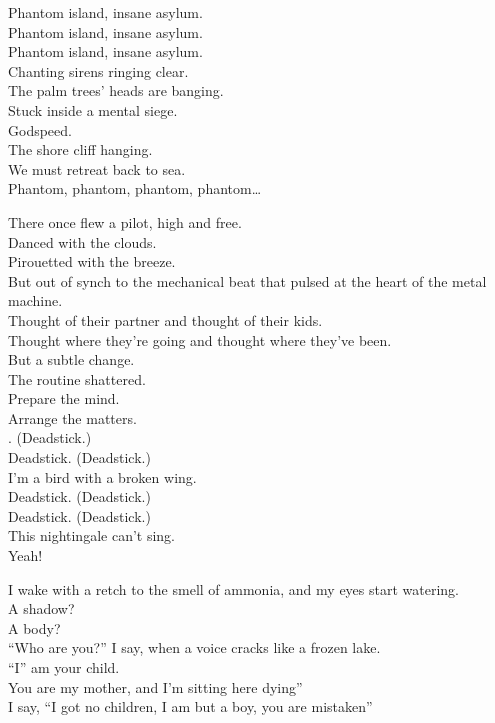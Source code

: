 Phantom island, insane asylum. \\
Phantom island, insane asylum. \\
Phantom island, insane asylum. \\
Chanting sirens ringing clear. \\

The palm trees' heads are banging. \\
Stuck inside a mental siege. \\
Godspeed. \\
The shore cliff hanging. \\
We must retreat back to sea. \\

Phantom, phantom, phantom, phantom… \\




There once flew a pilot, high and free. \\
Danced with the clouds. \\
Pirouetted with the breeze. \\
But out of synch to the mechanical beat that pulsed at the heart of the metal machine. \\
Thought of their partner and thought of their kids. \\
Thought where they're going and thought where they've been. \\
But a subtle change. \\
The routine shattered. \\
Prepare the mind. \\
Arrange the matters. \\

. (Deadstick.) \\
Deadstick. (Deadstick.) \\
I'm a bird with a broken wing. \\
Deadstick. (Deadstick.) \\
Deadstick. (Deadstick.) \\
This nightingale can't sing. \\
Yeah! \\


I wake with a retch to the smell of ammonia, and my eyes start watering. \\
A shadow? \\
A body? \\
``Who are you?'' I say, when a voice cracks like a frozen lake. \\
``I'' am your child. \\
You are my mother, and I'm sitting here dying'' \\
I say, ``I got no children, I am but a boy, you are mistaken'' \\

